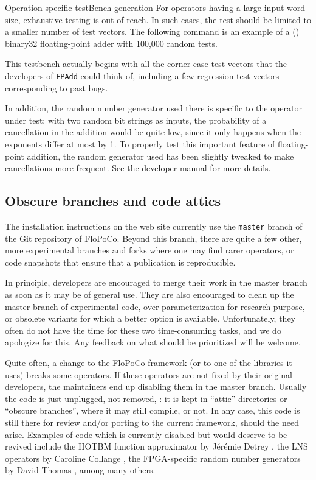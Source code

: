 \documentclass{article}
\begin{document}
\begin{flopocobox}{Operation-specific testBench generation}
  For operators having a large input word size, exhaustive testing is out of reach.
  In such cases, the test should be limited to a smaller number of test vectors.
  The following command is an example of a (\Float) binary32 floating-point adder with 100,000 random tests.

  This testbench actually begins with all the corner-case test vectors that the developers of \texttt{FPAdd} could think of, including a few regression test vectors corresponding to past bugs.

  In addition, the random number generator used there is specific to the operator under test: with two random bit strings as inputs, the probability of a cancellation in the addition would be quite low, since it only happens when the exponents differ at most by 1.
  To  properly test this important feature of floating-point addition, the random generator  used has been slightly tweaked to make cancellations more frequent.
  See the developer manual for more details.
\end{flopocobox}
  



\subsection{Obscure branches and code attics}
The installation instructions on the web site currently use  the \texttt{master} branch of the Git repository of FloPoCo.
Beyond this branch, there are quite a few other, more experimental branches and forks where one may find rarer operators, or code snapshots that ensure that a publication is reproducible.

In principle, developers are encouraged to merge  their work in the master branch as soon as it may be of general use.
They are also encouraged  to clean up the master branch of experimental code, over-parameterization for research purpose, or obsolete variants for which a better option is available.
Unfortunately, they often do not have the time for these two time-consuming tasks, and we do apologize for this.
Any feedback on what should be prioritized will be welcome.

Quite often, a change to the FloPoCo framework (or to one of the libraries it uses) breaks some operators.
If these operators are not fixed by their original developers, the maintainers end up disabling them in the master branch.
Usually the code is just unplugged, not removed, : it is kept in ``attic'' directories or ``obscure branches'', where it may still compile, or not.
In any case, this code is still there for review and/or porting to the current framework, should the need arise.
Examples of code which is currently disabled but would deserve to be revived include the HOTBM function approximator by Jérémie Detrey \cite{DetDin2005:asap}, the LNS operators by Caroline Collange \cite{VouzisCollangeArnold2010}, the FPGA-specific random number generators by David Thomas \cite{thomas-13-table-hadamard-grng}, among many others.
\end{document}
